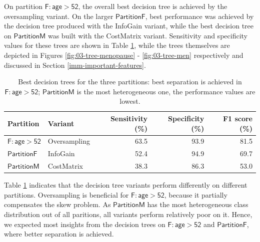 \documentclass[
  oneside]{book}
\begin{document}
On partition \(\mathsf{F:age>52}\), the overall best decision tree is achieved by the oversampling variant.
On the larger \(\mathsf{PartitionF}\), best performance was achieved by the decision tree produced with the InfoGain variant, while the best decision tree on \(\mathsf{PartitionM}\) was built with the CostMatrix variant.
Sensitivity and specificity values for these trees are shown in Table \ref{tab:03-tree-performance-sens-spec}, while the trees themselves are depicted in Figures \ref{fig:03-tree-menopause} - \ref{fig:03-tree-men} respectively and discussed in Section \ref{imm-important-features}.



\begin{table}

\caption{\label{tab:03-tree-performance-sens-spec}Best decision trees for the three partitions: best separation is achieved in \(\mathsf{F:age>52}\); \(\mathsf{PartitionM}\) is the most heterogeneous one, the performance values are lowest.}
\centering
\begin{tabular}[t]{llrrr}
\toprule
\textbf{Partition} & \textbf{Variant} & \textbf{Sensitivity (\%)} & \textbf{Specificity (\%)} & \textbf{F1 score (\%)}\\
\midrule
$\mathsf{F:age}>\mathsf{52}$ & Oversampling & 63.5 & 93.9 & 81.5\\
$\mathsf{PartitionF}$ & InfoGain & 52.4 & 94.9 & 69.7\\
$\mathsf{PartitionM}$ & CostMatrix & 38.3 & 86.3 & 53.0\\
\bottomrule
\end{tabular}
\end{table}

Table \ref{tab:03-tree-performance-sens-spec} indicates that the decision tree variants perform differently on different partitions.
Oversampling is beneficial for \(\mathsf{F:age>52}\), because it partially compensates the skew problem.
As \(\mathsf{PartitionM}\) has the most heterogeneous class distribution out of all paritions, all variants perform relatively poor on it.
Hence, we expected most insights from the decision trees on \(\mathsf{F:age>52}\) and \(\mathsf{PartitionF}\), where better separation is achieved.
\end{document}
